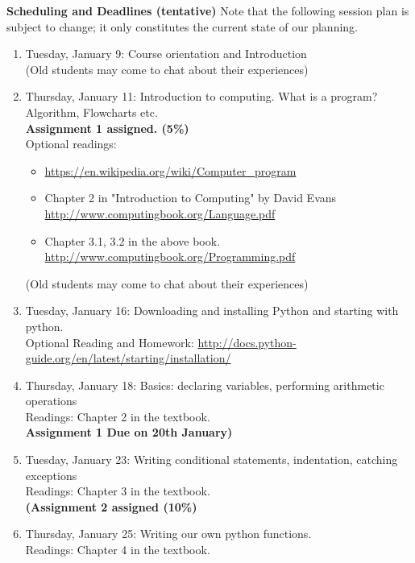 \documentclass[11pt,a4paper]{article}
\begin{document}
\bigskip\textbf{\large Scheduling and Deadlines (tentative)}
Note that the following session plan is subject to change; it only constitutes the current state of our planning.
 \begin{enumerate}\itemsep0ex

  \item Tuesday, January 9: Course orientation and Introduction 
 \\  (Old students may come to chat about their experiences)
  
  \item Thursday, January 11: Introduction to computing. What is a program? Algorithm, Flowcharts etc. 
    \\ \textbf{Assignment 1 assigned. (5\%)}
  \\ Optional readings:
  \begin{itemize} 
  \item \url{https://en.wikipedia.org/wiki/Computer_program}
  \item Chapter 2 in "Introduction to Computing" by David Evans \\ \url{http://www.computingbook.org/Language.pdf}
  \item Chapter 3.1, 3.2 in the above book. \url{http://www.computingbook.org/Programming.pdf}
   \end{itemize}
   (Old students may come to chat about their experiences)

\item Tuesday, January 16: Downloading and installing Python and starting with python. 
  \\ Optional Reading and Homework: \url{http://docs.python-guide.org/en/latest/starting/installation/}
  
 \item Thursday, January 18: Basics: declaring variables, performing arithmetic operations 
 \\ Readings: Chapter 2 in the textbook.
  \\  \textbf{Assignment 1 Due on 20th January)}

  \item Tuesday, January 23: Writing conditional statements, indentation, catching exceptions 
  \\ Readings: Chapter 3 in the textbook.
\\ \textbf{(Assignment 2 assigned (10\%)}

  \item Thursday, January 25: Writing our own python functions. 
  \\ Readings: Chapter 4 in the textbook.


\end{enumerate}
\end{document}
